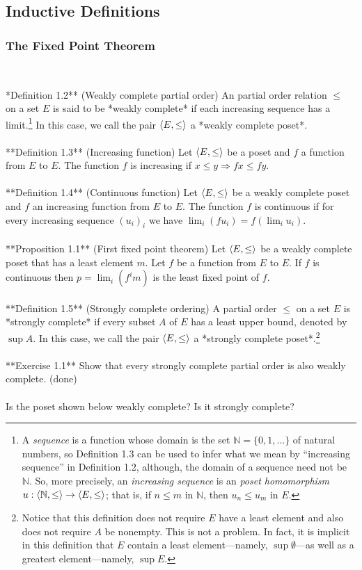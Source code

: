 \subsection{Inductive Definitions}

\subsubsection{The Fixed Point Theorem}\

\noindent **Definition 1.2** (Weakly complete partial order) An partial order relation
$\leq$ on a set $E$ is said to be *weakly complete* if each increasing sequence has a 
limit.\footnote{A \emph{sequence} is a function whose domain is
the set $\mathbb{N} = \{0,1,\dots\}$ of natural numbers, so Definition 1.3
can be used to infer what we mean by ``increasing sequence'' in Definition 1.2, although,
the domain of a sequence need not be $\mathbb{N}$. So, more precisely, 
an \emph{increasing sequence} is an \emph{poset homomorphism} $u: \langle\mathbb{N}, \leq\rangle \to
\langle E, \leq \rangle$; that is, if $n\leq m$ in $\mathbb{N}$, then $u_n \leq u_m$ in
$E$.} In this case, we call the pair $\langle E, \leq\rangle$ a *weakly complete poset*.\\
\\
**Definition 1.3** (Increasing function) Let $\langle E, \leq\rangle$ be a poset
and $f$ a function from $E$ to $E$. The function $f$ is increasing if
$x \leq y \Rightarrow f x \leq fy$. \\
\\
**Definition 1.4** (Continuous function) Let $\langle E, \leq\rangle$ be a weakly complete poset
and $f$ an increasing function from $E$ to $E$. 
The function $f$ is continuous if for every increasing sequence $(u_i)_i$
we have  $\lim_i (f u_i ) = f (\lim_i u_i )$.\\
\\
**Proposition 1.1** (First fixed point theorem) Let $\langle E,\leq\rangle$ be a weakly complete
poset that has a least element $m$. Let $f$ be a function from $E$ to $E$. 
If $f$ is continuous then $p = \lim_i (f^i m)$ is the least fixed
point of $f$. \\
\\
**Definition 1.5** (Strongly complete ordering) A partial order $\leq$ on a set $E$
is *strongly complete* if every subset $A$ of
$E$ has a least upper bound, denoted by $\sup A$.
In this case, we call the pair $\langle E, \leq\rangle$ a *strongly complete poset*.\footnote{Notice that this definition
  does not require $E$ have a least element and also does not require
  $A$ be nonempty.  This is not a problem. In fact, it is implicit in this definition that
  $E$ contain a least element---namely, $\sup \emptyset$---as well as a greatest 
  element---namely, $\sup E$.}\\
\\
**Exercise 1.1** Show that every strongly complete partial order is also weakly complete.  
(done)\\
\\
Is the poset shown below weakly complete? Is it strongly complete?  

